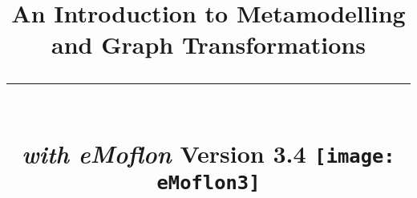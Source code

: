 \title{
\flushright
{\LARGE\bfseries An Introduction to Metamodelling\\
and Graph Transformations}
\noindent\rule[-1ex]{\textwidth}{5pt}\\[2.5ex]
\hfill\emph{\LARGE\bfseries with eMoflon}
\flushleft
{\small Version 3.4}
\flushright
\texttt{[image: eMoflon3]} 
}

\date{}  
\author{} 